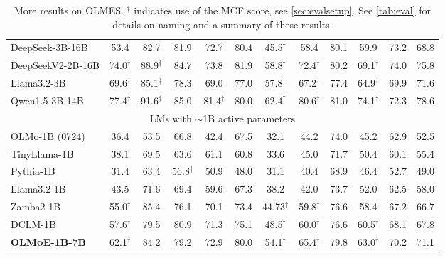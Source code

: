 \documentclass{article}
\newcommand{\modelsmall}{\textbf{\textsc{OLMoE-1B-7B}}}
\begin{document}
\begin{table}
\begin{tabular}{l|ccccccccccc}
DeepSeek-3B-16B & 53.4 & 82.7 & 81.9 & 72.7 & 80.4 & 45.5$^\dagger$ & 58.4 & 80.1 & 59.9 & 73.2 & 68.8 \\
DeepSeekV2-2B-16B & 74.0$^\dagger$ & 88.9$^\dagger$ & 84.7 & 73.8 & 81.9 & 58.8$^\dagger$ & 72.4$^\dagger$ & 80.2 & 69.1$^\dagger$ & 74.0 & 75.8 \\
Llama3.2-3B & 69.6$^\dagger$ & 85.1$^\dagger$ & 78.3 & 69.0 & 77.0 & 57.8$^\dagger$ & 67.2$^\dagger$ & 77.4 & 64.9$^\dagger$ & 69.9 & 71.6 \\
Qwen1.5-3B-14B & 77.4$^\dagger$ & 91.6$^\dagger$ & 85.0 & 81.4$^\dagger$ & 80.0 & $62.4^\dagger$ & 80.6$^\dagger$ & 81.0 & 74.1$^\dagger$ & 72.3 & 78.6 \\
\midrule
\multicolumn{12}{c}{LMs with $\sim$1B active parameters} \\
\midrule
OLMo-1B (0724) & 36.4 & 53.5 & 66.8 & 42.4 & 67.5 & 32.1 & 44.2 & 74.0 & 45.2 & 62.9 & 52.5 \\
TinyLlama-1B & 38.1 & 69.5 & 63.6 & 61.1 & 60.8 & 33.6 & 45.0 & 71.7 & 50.4 & 60.1 & 55.4 \\
Pythia-1B & 31.4 & 63.4 & 56.8$^\dagger$ & 50.9 & 48.0 & 31.1 & 40.4 & 68.9 & 46.4 & 52.7 & 49.0 \\
Llama3.2-1B & 43.5 & 71.6 & 69.4 & 59.6 & 67.3 & 38.2 & 42.0 & 73.7 & 52.0 & 62.5 & 58.0 \\
Zamba2-1B & 55.0$^\dagger$ & 85.4 & 76.1 & 70.1 & 73.4 & 44.73$^\dagger$ & 59.8$^\dagger$ & 76.6 & 58.4 & 67.2 & 66.7 \\
DCLM-1B & 57.6$^\dagger$ & 79.5 & 80.9 & 71.3 & 75.1 & 48.5$^\dagger$ & 60.0$^\dagger$ & 76.6 & 60.5$^\dagger$ & 68.1 & 67.8 \\
\rowcolor{lightOlmoeYellow}
\modelsmall{} & 62.1$^\dagger$ & 84.2 & 79.2 & 72.9 & 80.0 & 54.1$^\dagger$ & 65.4$^\dagger$ & 79.8 & 63.0$^\dagger$ & 70.2 & 71.1 \\
\bottomrule
\end{tabular}
\caption{More results on OLMES. $^\dagger$ indicates use of the MCF score, see \autoref{sec:evalsetup}. See \autoref{tab:eval} for details on naming and a summary of these results.}
\label{tab:addolmes}
\end{table}
\end{document}
